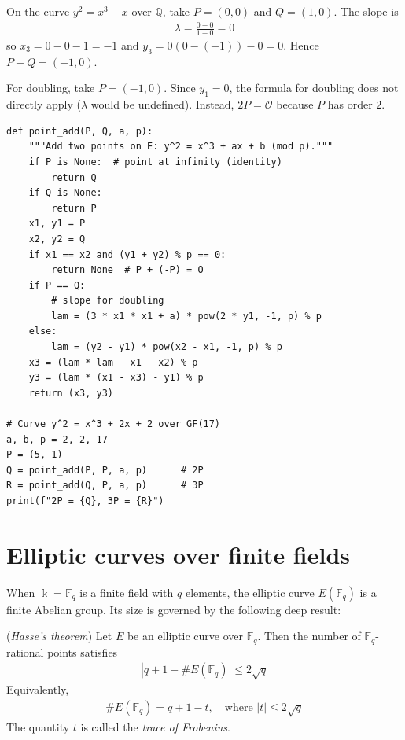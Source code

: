 \documentclass[a4paper, 12pt]{book} %
\begin{document}
\begin{example}
    On the curve $y^2 = x^3 - x$ over $\mathbb{Q}$, take $P = (0, 0)$ and $Q = (1, 0)$. The slope is
    \begin{align}
        \lambda = \frac{0 - 0}{1 - 0} = 0
    \end{align}
    so $x_3 = 0 - 0 - 1 = -1$ and $y_3 = 0(0 - (-1)) - 0 = 0$. Hence $P + Q = (-1, 0)$.
    
    For doubling, take $P = (-1, 0)$. Since $y_1 = 0$, the formula for doubling does not directly apply ($\lambda$ would be undefined). Instead, $2P = \mathcal{O}$ because $P$ has order $2$.
\end{example}

\begin{verbatim}
def point_add(P, Q, a, p):
    """Add two points on E: y^2 = x^3 + ax + b (mod p)."""
    if P is None:  # point at infinity (identity)
        return Q
    if Q is None:
        return P
    x1, y1 = P
    x2, y2 = Q
    if x1 == x2 and (y1 + y2) % p == 0:
        return None  # P + (-P) = O
    if P == Q:
        # slope for doubling
        lam = (3 * x1 * x1 + a) * pow(2 * y1, -1, p) % p
    else:
        lam = (y2 - y1) * pow(x2 - x1, -1, p) % p
    x3 = (lam * lam - x1 - x2) % p
    y3 = (lam * (x1 - x3) - y1) % p
    return (x3, y3)

# Curve y^2 = x^3 + 2x + 2 over GF(17)
a, b, p = 2, 2, 17
P = (5, 1)
Q = point_add(P, P, a, p)      # 2P
R = point_add(Q, P, a, p)      # 3P
print(f"2P = {Q}, 3P = {R}")
\end{verbatim}

\section{Elliptic curves over finite fields}

When $\Bbbk = \mathbb{F}_q$ is a finite field with $q$ elements, the elliptic curve
$E(\mathbb{F}_q)$ is a finite Abelian group. Its size is governed by the following
deep result:

\begin{theorem}
    (\emph{Hasse's theorem}) Let $E$ be an elliptic curve over $\mathbb{F}_q$. Then the number of $\mathbb{F}_q$-rational points satisfies
    \begin{align}
        |q + 1 - \#E(\mathbb{F}_q)| \leq 2\sqrt{q}
    \end{align}
    Equivalently,
    \begin{align}
        \#E(\mathbb{F}_q) = q + 1 - t, \quad \text{where } |t| \leq 2\sqrt{q}
    \end{align}
    The quantity $t$ is called the \emph{trace of Frobenius}.
\end{theorem}
\end{document}

